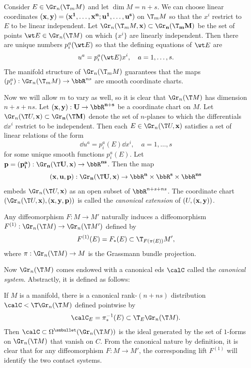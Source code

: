 Consider $E\in\Gr_n(\T_m M)$ and let $\dim M=n+s$. We can choose linear coordinates $(\bf{x},\bf{y})=(x^1,\ldots,x^n;u^1,\ldots,u^s)$ on $\T_m M$ so that the $x^i$ restrict to $E$ to be linear independent. Let $\Gr_n(\T_m M,\bf{x})\subset \Gr_n(\T_m M)$ be the set of points $\wt E\in\Gr_n(\T M)$ on which $\{x^i\}$ are linearly independent. Then there are unique numbers $p_i^a(\wt E)$ so that the defining equations of $\wt E$ are 
\[u^a=p^a_i(\wt E)x^i,\quad a=1,\ldots,s.\label{eq 18014}\]
The manifold structure of $\Gr_n(\T_m M)$  guarantees that the maps $(p^a_i):\Gr_n(\T_m M)\to \bbR^{ns}$ are smooth coordinate charts. 

Now we will allow $m$ to vary as well, so it is clear that $\Gr_n(\T M)$ has dimension $n+s+ns$. Let $(\bf{x},\bf{y}):U\to \bbR^{n+s}$ be a coordinate chart on $M$. Let $\Gr_n(\T U,\bf{x})\subset \Gr_n(\T M)$ denote the set of $n$-planes to which the differentials $\dd x^i$ restrict to be independent. Then each $E\in\Gr_n(\T U,\bf{x})$ satisfies a set of linear relations of the form 
\[\dd u^a=p^a_i(E)\dd x^i,\quad a=1,\ldots,s\]
for some unique smooth functions $p_i^a(E)$. Let $\bf{p}=(p^a_i):\Gr_n(\T U,\bf{x})\to \bbR^{ns}$. Then the map 
\[(\bf{x},\bf{u},\bf{p}):\Gr_n(\T U,\bf{x})\to \bbR^n\times\bbR^s\times\bbR^{ns}\]
embeds $\Gr_n(\T U,\bf{x})$ as an open subset of $\bbR^{n+s+ns}$. The coordinate chart $(\Gr_n(\T U,\bf{x}),(\bf{x},\bf{y},\bf{p}))$ is called the \emph{canonical extension} of $(U,(\bf{x},\bf{y}))$.

Any diffeomorphism $F:M\to M'$ naturally induces a diffeomorphism $F^{(1)}:\Gr_n(\T M)\to \Gr_n(\T M')$ defined by 
\[F^{(1)}(E)=F_\ast(E)\subset \T_{F(\pi(E))}M',\]
where $\pi:\Gr_n(\T M)\to M$ is the Grassmann bundle projection. 

Now $\Gr_n(\T M)$ comes endowed with a canonical \gls{eds} $\calC$ called the \emph{canonical system}. Abstractly, it is defined as follows: 

\begin{defn}
    If $M$ is a manifold, there is a canonical rank-$(n+ns)$ distribution $\calC< \T \Gr_n(\T M)$ defined pointwise by 
    \[\calC_E=\pi_\ast^{-1}(E)\subset \T_E\Gr_n(\T M).\]
    Then $\calC\subset\Omega^{\smbullet}(\Gr_n(\T M))$ is the ideal generated by the set of $1$-forms on $\Gr_n(\T M)$ that vanish on $C$. From the canonical nature by definition, it is clear that for any diffeomorphism $F:M\to M'$, the corresponding lift $F^{(1)}$ will identify the two contact systems.
\end{defn}

